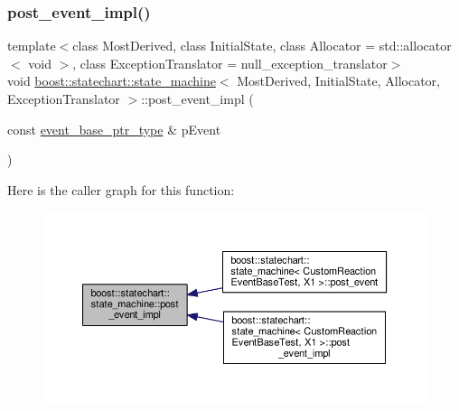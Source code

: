 \mbox{\label{classboost_1_1statechart_1_1state__machine_ac2e9c9c0d773811364289ae11d21f0fc}} 
\subsubsection{\texorpdfstring{post\+\_\+event\+\_\+impl()}{post\_event\_impl()}\hspace{0.1cm}{\footnotesize\ttfamily [1/2]}}
{\footnotesize\ttfamily template$<$class Most\+Derived, class Initial\+State, class Allocator = std\+::allocator$<$ void $>$, class Exception\+Translator = null\+\_\+exception\+\_\+translator$>$ \\
void \mbox{\hyperlink{classboost_1_1statechart_1_1state__machine}{boost\+::statechart\+::state\+\_\+machine}}$<$ Most\+Derived, Initial\+State, Allocator, Exception\+Translator $>$\+::post\+\_\+event\+\_\+impl (\begin{DoxyParamCaption}\item[{const \mbox{\hyperlink{classboost_1_1statechart_1_1state__machine_aa2f1c567e2d1a66786d28769312dfa08}{event\+\_\+base\+\_\+ptr\+\_\+type}} \&}]{p\+Event }\end{DoxyParamCaption})\hspace{0.3cm}{\ttfamily [inline]}}

Here is the caller graph for this function\+:
\nopagebreak
\begin{figure}[H]
\begin{center}
\leavevmode
\includegraphics[width=350pt]{classboost_1_1statechart_1_1state__machine_ac2e9c9c0d773811364289ae11d21f0fc_icgraph}
\end{center}
\end{figure}
\mbox{\label{classboost_1_1statechart_1_1state__machine_a1c2de8cd216efdafba64c256ed2c958c}} 
